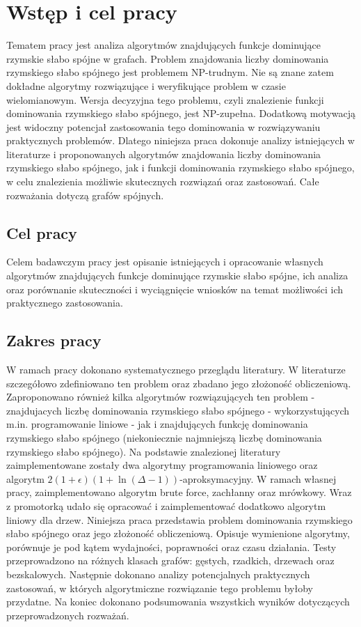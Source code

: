 \chapter{Wstęp i cel pracy}
Tematem pracy jest analiza algorytmów znajdujących funkcje dominujące rzymskie słabo spójne w grafach.
Problem znajdowania liczby dominowania rzymskiego słabo spójnego jest problemem NP-trudnym. Nie są znane zatem dokładne algorytmy rozwiązujące i weryfikujące problem w czasie wielomianowym. Wersja decyzyjna tego problemu, czyli znalezienie funkcji dominowania rzymskiego słabo spójnego, jest NP-zupełna. Dodatkową motywacją jest widoczny potencjał zastosowania tego dominowania w rozwiązywaniu praktycznych problemów. Dlatego niniejsza praca dokonuje analizy istniejących w literaturze i proponowanych algorytmów znajdowania liczby dominowania rzymskiego słabo spójnego, jak i funkcji dominowania rzymskiego słabo spójnego, w celu znalezienia możliwie skutecznych rozwiązań oraz zastosowań. Całe rozważania dotyczą grafów spójnych.

\section{Cel pracy}
Celem badawczym pracy jest opisanie istniejących i opracowanie własnych algorytmów znajdujących funkcje dominujące rzymskie słabo spójne, ich analiza oraz porównanie skuteczności i wyciągnięcie wniosków na temat możliwości ich praktycznego zastosowania.

\section{Zakres pracy}
W ramach pracy dokonano systematycznego przeglądu literatury. W literaturze szczegółowo zdefiniowano ten problem oraz zbadano jego złożoność obliczeniową. Zaproponowano również kilka algorytmów rozwiązujących ten problem - znajdujacych liczbę dominowania rzymskiego słabo spójnego - wykorzystujących m.in. programowanie liniowe - jak i znajdujących funkcję dominowania rzymskiego słabo spójnego (niekoniecznie najmniejszą liczbę dominowania rzymskiego słabo spójnego). Na podstawie znalezionej literatury zaimplementowane zostały dwa algorytmy programowania liniowego oraz algorytm $2(1+\epsilon)(1 + \ln(\Delta - 1))$-aproksymacyjny. W ramach własnej pracy, zaimplementowano algorytm brute force, zachłanny oraz mrówkowy. Wraz z promotorką udało się opracować i zaimplementować dodatkowo algorytm liniowy dla drzew. Niniejsza praca przedstawia problem dominowania rzymskiego słabo spójnego oraz jego złożoność obliczeniową. Opisuje wymienione algorytmy, porównuje je pod kątem wydajności, poprawności oraz czasu działania. Testy przeprowadzono na różnych klasach grafów: gęstych, rzadkich, drzewach oraz bezskalowych. Następnie dokonano analizy potencjalnych praktycznych zastosowań, w których algorytmiczne rozwiązanie tego problemu byłoby przydatne. Na koniec dokonano podsumowania wszystkich wyników dotyczących przeprowadzonych rozważań.